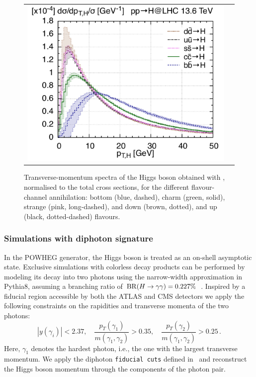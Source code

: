 \documentclass[11pt,a4paper]{article}
\begin{document}
\begin{figure}[t!]
\begin{center}
\begin{tabular}{cc}
\includegraphics[width=.52\textwidth, page=1]{plots/5fs/light/ptHzoom_qqH.pdf}
\end{tabular}
\vspace*{1ex}
\caption{Transverse-momentum spectra of the Higgs boson obtained with \minnlo{}, normalised to the total cross sections, for the different flavour-channel annihilation: bottom (blue, dashed), charm (green, solid), strange (pink, long-dashed), and down (brown, dotted), and  up (black, dotted-dashed) flavours.
\label{fig:lightpTHzoom}}
\end{center}
\end{figure}

\subsubsection{Simulations with diphoton signature}
In the POWHEG generator, the Higgs boson is treated as an on-shell asymptotic state. Exclusive simulations with colorless decay products can be performed by modeling its decay into two photons using the narrow-width approximation in Pythia8, assuming a branching ratio of \({\rm BR}(H \to \gamma\gamma) = 0.227\%\)~\cite{LHCHiggsCrossSectionWorkingGroup:2016ypw}.
Inspired by a fiducial region accessible by both the ATLAS and CMS detectors we apply the following constraints on the rapidities and transverse momenta of the two photons:
\begin{equation}
|y(\gamma_i)|< 2.37, \quad
\frac{p_T(\gamma_1)}{m(\gamma_1, \gamma_2)} > 0.35,\quad \frac{p_T(\gamma_2)}{m(\gamma_1, \gamma_2)} > 0.25\,. \label{eq:aafidmycuts}
\end{equation}
Here, \( \gamma_1 \) denotes the hardest photon, i.e., the one with the largest transverse momentum. We apply the diphoton \texttt{fiducial cuts} defined in~ and reconstruct the Higgs boson momentum through the components of the photon pair.
\end{document}
